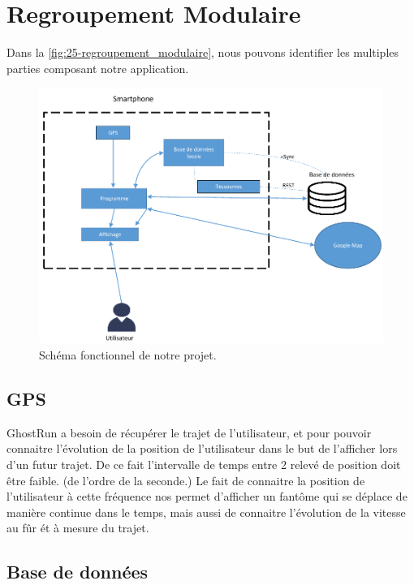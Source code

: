 \chapter{Regroupement Modulaire}

Dans la \autoref{fig:25-regroupement_modulaire}, nous pouvons identifier les multiples parties composant notre application.

\begin{figure}[h]
    \centering
    \includegraphics[keepaspectratio, width=2\textwidth/2, height=2\textheight/5]{ima/regroupement_modulaire}
    \caption{Schéma fonctionnel de notre projet.}
    \label{fig:25-regroupement_modulaire}
\end{figure}

\section{GPS}
GhostRun a besoin de récupérer le trajet de l'utilisateur, et pour pouvoir connaitre l'évolution de la position de l'utilisateur
dans le but de l'afficher lors d'un futur trajet. De ce fait l'intervalle de temps entre 2 relevé de position doit être faible.
(de l'ordre de la seconde.)
Le fait de connaitre la position de l'utilisateur à cette fréquence nos permet d'afficher un fantôme qui se déplace de manière continue dans le temps,
mais aussi de connaitre l'évolution de la vitesse au fûr ét à mesure du trajet.

\section{Base de données}

